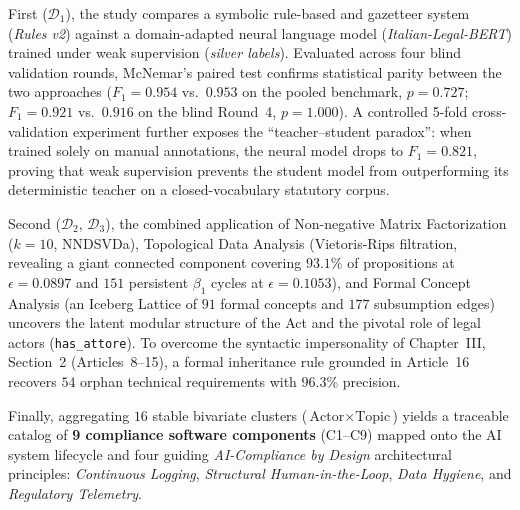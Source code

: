 \documentclass[12pt,a4paper,oneside]{article}
\begin{document}
First ($\mathcal{D}_1$), the study compares a symbolic rule-based and gazetteer system (\emph{Rules v2}) against a domain-adapted neural language model (\emph{Italian-Legal-BERT}) trained under weak supervision (\emph{silver labels}). Evaluated across four blind validation rounds, McNemar's paired test confirms statistical parity between the two approaches ($F_1 = 0.954$ vs.\ $0.953$ on the pooled benchmark, $p = 0.727$; $F_1 = 0.921$ vs.\ $0.916$ on the blind Round~4, $p = 1.000$). A controlled 5-fold cross-validation experiment further exposes the ``teacher--student paradox'': when trained solely on manual annotations, the neural model drops to $F_1 = 0.821$, proving that weak supervision prevents the student model from outperforming its deterministic teacher on a closed-vocabulary statutory corpus.

Second ($\mathcal{D}_2$, $\mathcal{D}_3$), the combined application of Non-negative Matrix Factorization ($k=10$, NNDSVDa), Topological Data Analysis (Vietoris-Rips filtration, revealing a giant connected component covering $93.1\%$ of propositions at $\epsilon = 0.0897$ and $151$ persistent $\beta_1$ cycles at $\epsilon = 0.1053$), and Formal Concept Analysis (an Iceberg Lattice of $91$ formal concepts and $177$ subsumption edges) uncovers the latent modular structure of the Act and the pivotal role of legal actors (\texttt{has\_attore}). To overcome the syntactic impersonality of Chapter~III, Section~2 (Articles~8--15), a formal inheritance rule grounded in Article~16 recovers $54$ orphan technical requirements with $96.3\%$ precision.

Finally, aggregating $16$ stable bivariate clusters ($\text{Actor} \times \text{Topic}$) yields a traceable catalog of \textbf{9 compliance software components} (C1--C9) mapped onto the AI system lifecycle and four guiding \emph{AI-Compliance by Design} architectural principles: \emph{Continuous Logging}, \emph{Structural Human-in-the-Loop}, \emph{Data Hygiene}, and \emph{Regulatory Telemetry}.
\end{document}
